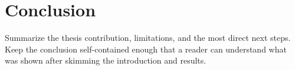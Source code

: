 
\chapter{Conclusion}
\label{ch:conclusion}

Summarize the thesis contribution, limitations, and the most direct next steps.
Keep the conclusion self-contained enough that a reader can understand what was
shown after skimming the introduction and results.
